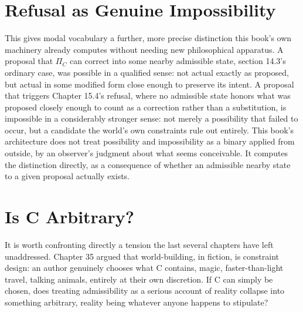 \section{Refusal as Genuine Impossibility}

This gives modal vocabulary a further, more precise distinction this book's own machinery already computes without needing new philosophical apparatus. A proposal that \(\Pi_C\) can correct into some nearby admissible state, section 14.3's ordinary case, was possible in a qualified sense: not actual exactly as proposed, but actual in some modified form close enough to preserve its intent. A proposal that triggers Chapter 15.4's refusal, where no admissible state honors what was proposed closely enough to count as a correction rather than a substitution, is impossible in a considerably stronger sense: not merely a possibility that failed to occur, but a candidate the world's own constraints rule out entirely. This book's architecture does not treat possibility and impossibility as a binary applied from outside, by an observer's judgment about what seems conceivable. It computes the distinction directly, as a consequence of whether an admissible nearby state to a given proposal actually exists.

\section{Is C Arbitrary?}

It is worth confronting directly a tension the last several chapters have left unaddressed. Chapter 35 argued that world-building, in fiction, is constraint design: an author genuinely chooses what C contains, magic, faster-than-light travel, talking animals, entirely at their own discretion. If C can simply be chosen, does treating admissibility as a serious account of reality collapse into something arbitrary, reality being whatever anyone happens to stipulate?

